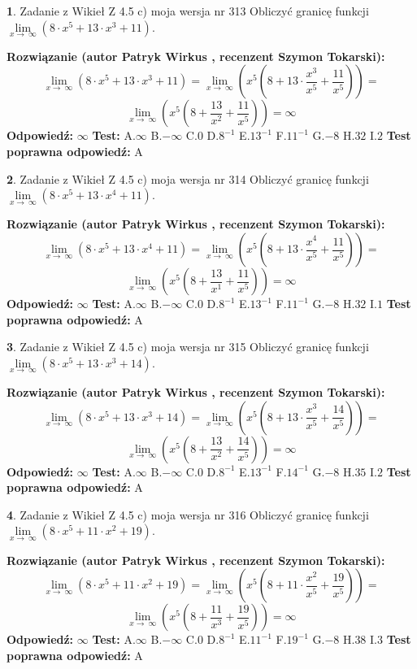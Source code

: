 \documentclass[12pt, a4paper]{article}
\theoremstyle{definition} %
\newtheorem{zad}{}
\newcommand{\zadStart}[1]{\begin{zad}#1\newline}
\newcommand{\zadStop}{\end{zad}}
\newcommand{\rozwStart}[2]{\noindent \textbf{Rozwiązanie (autor #1 , recenzent #2): }\newline}
\newcommand{\rozwStop}{\newline}
\newcommand{\odpStart}{\noindent \textbf{Odpowiedź:}\newline}
\newcommand{\odpStop}{\newline}
\newcommand{\testStart}{\noindent \textbf{Test:}\newline}
\newcommand{\testStop}{\newline}
\newcommand{\kluczStart}{\noindent \textbf{Test poprawna odpowiedź:}\newline}
\newcommand{\kluczStop}{\newline}
\begin{document}
\zadStart{Zadanie z Wikieł Z 4.5 c) moja wersja nr 313}
Obliczyć granicę funkcji  $\lim\limits_{x\to\ \infty}(8 \cdot x^{5}+13 \cdot x^{3}+11)$.
\zadStop
\rozwStart{Patryk Wirkus}{Szymon Tokarski}
$$\lim\limits_{x\to\ \infty}(8 \cdot x^{5}+13 \cdot x^{3}+11) = \lim\limits_{x\to\ \infty}(x^{5}(8 +13 \cdot \frac{x^{3}}{x^{5}}+\frac{11}{x^{5}})) =$$ $$\lim\limits_{x\to\ \infty}(x^{5}(8 +\frac{13}{x^{2}}+\frac{11}{x^{5}})) =\infty$$
\rozwStop
\odpStart
$\infty$
\odpStop
\testStart
A.$\infty$ B.$-\infty$ C.$0$ D.$8^{-1}$ E.$13^{-1}$
F.$11^{-1}$ G.$-8$
H.$32$
I.$2$
\testStop
\kluczStart
A
\kluczStop



\zadStart{Zadanie z Wikieł Z 4.5 c) moja wersja nr 314}
Obliczyć granicę funkcji  $\lim\limits_{x\to\ \infty}(8 \cdot x^{5}+13 \cdot x^{4}+11)$.
\zadStop
\rozwStart{Patryk Wirkus}{Szymon Tokarski}
$$\lim\limits_{x\to\ \infty}(8 \cdot x^{5}+13 \cdot x^{4}+11) = \lim\limits_{x\to\ \infty}(x^{5}(8 +13 \cdot \frac{x^{4}}{x^{5}}+\frac{11}{x^{5}})) =$$ $$\lim\limits_{x\to\ \infty}(x^{5}(8 +\frac{13}{x^{1}}+\frac{11}{x^{5}})) =\infty$$
\rozwStop
\odpStart
$\infty$
\odpStop
\testStart
A.$\infty$ B.$-\infty$ C.$0$ D.$8^{-1}$ E.$13^{-1}$
F.$11^{-1}$ G.$-8$
H.$32$
I.$1$
\testStop
\kluczStart
A
\kluczStop



\zadStart{Zadanie z Wikieł Z 4.5 c) moja wersja nr 315}
Obliczyć granicę funkcji  $\lim\limits_{x\to\ \infty}(8 \cdot x^{5}+13 \cdot x^{3}+14)$.
\zadStop
\rozwStart{Patryk Wirkus}{Szymon Tokarski}
$$\lim\limits_{x\to\ \infty}(8 \cdot x^{5}+13 \cdot x^{3}+14) = \lim\limits_{x\to\ \infty}(x^{5}(8 +13 \cdot \frac{x^{3}}{x^{5}}+\frac{14}{x^{5}})) =$$ $$\lim\limits_{x\to\ \infty}(x^{5}(8 +\frac{13}{x^{2}}+\frac{14}{x^{5}})) =\infty$$
\rozwStop
\odpStart
$\infty$
\odpStop
\testStart
A.$\infty$ B.$-\infty$ C.$0$ D.$8^{-1}$ E.$13^{-1}$
F.$14^{-1}$ G.$-8$
H.$35$
I.$2$
\testStop
\kluczStart
A
\kluczStop



\zadStart{Zadanie z Wikieł Z 4.5 c) moja wersja nr 316}
Obliczyć granicę funkcji  $\lim\limits_{x\to\ \infty}(8 \cdot x^{5}+11 \cdot x^{2}+19)$.
\zadStop
\rozwStart{Patryk Wirkus}{Szymon Tokarski}
$$\lim\limits_{x\to\ \infty}(8 \cdot x^{5}+11 \cdot x^{2}+19) = \lim\limits_{x\to\ \infty}(x^{5}(8 +11 \cdot \frac{x^{2}}{x^{5}}+\frac{19}{x^{5}})) =$$ $$\lim\limits_{x\to\ \infty}(x^{5}(8 +\frac{11}{x^{3}}+\frac{19}{x^{5}})) =\infty$$
\rozwStop
\odpStart
$\infty$
\odpStop
\testStart
A.$\infty$ B.$-\infty$ C.$0$ D.$8^{-1}$ E.$11^{-1}$
F.$19^{-1}$ G.$-8$
H.$38$
I.$3$
\testStop
\kluczStart
A
\kluczStop
\end{document}
